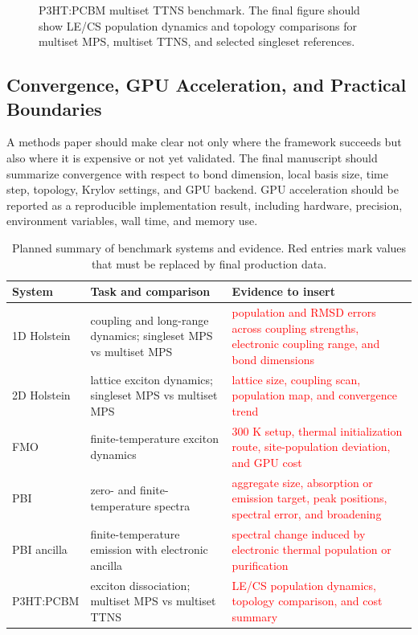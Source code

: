 \documentclass[journal=jctcce,manuscript=article]{achemso}
\newcommand{\placeholder}[1]{\textcolor{red}{#1}}
\newcommand{\figureplaceholder}[2]{%
\begin{figure}[htbp]
    \centering
    \fbox{%
    \begin{minipage}[c][0.24\textheight][c]{0.82\textwidth}
        \centering
        \textbf{Figure dummy: #1}\\[0.5em]
        \placeholder{#2}
    \end{minipage}}
    \caption{#2}
    \label{fig:#1}
\end{figure}}
\begin{document}
\figureplaceholder{p3ht-pcbm-ttns}{P3HT:PCBM multiset TTNS benchmark. The final figure should show LE/CS population dynamics and topology comparisons for multiset MPS, multiset TTNS, and selected singleset references.}

\subsection{Convergence, GPU Acceleration, and Practical Boundaries}

A methods paper should make clear not only where the framework succeeds but also where it is expensive or not yet validated. The final manuscript should summarize convergence with respect to bond dimension, local basis size, time step, topology, Krylov settings, and GPU backend. GPU acceleration should be reported as a reproducible implementation result, including hardware, precision, environment variables, wall time, and memory use.

\begin{table}[htbp]
    \centering
    \small
    \caption{Planned summary of benchmark systems and evidence. Red entries mark values that must be replaced by final production data.}
    \label{tab:evidence-map}
    \begin{tabularx}{\textwidth}{p{}p{}X}
        \toprule
        System & Task and comparison & Evidence to insert \\
        \midrule
        1D Holstein & coupling and long-range dynamics; singleset MPS vs multiset MPS & \placeholder{population and RMSD errors across coupling strengths, electronic coupling range, and bond dimensions} \\
        2D Holstein & lattice exciton dynamics; singleset MPS vs multiset MPS & \placeholder{lattice size, coupling scan, population map, and convergence trend} \\
        FMO & finite-temperature exciton dynamics & \placeholder{300 K setup, thermal initialization route, site-population deviation, and GPU cost} \\
        PBI & zero- and finite-temperature spectra & \placeholder{aggregate size, absorption or emission target, peak positions, spectral error, and broadening} \\
        PBI ancilla & finite-temperature emission with electronic ancilla & \placeholder{spectral change induced by electronic thermal population or purification} \\
        P3HT:PCBM & exciton dissociation; multiset MPS vs multiset TTNS & \placeholder{LE/CS population dynamics, topology comparison, and cost summary} \\
        \bottomrule
    \end{tabularx}
\end{table}
\end{document}
